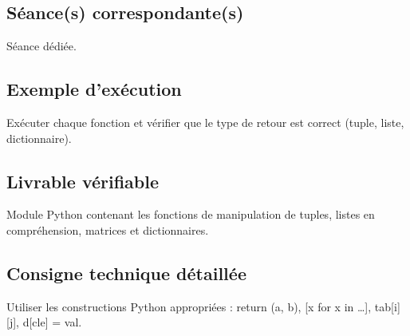 \subsection{Séance(s) correspondante(s)}

Séance dédiée.

\subsection{Exemple d’exécution}

Exécuter chaque fonction et vérifier que le type de retour est correct
(tuple, liste, dictionnaire).

\subsection{Livrable vérifiable}

Module Python contenant les fonctions de manipulation de tuples, listes
en compréhension, matrices et dictionnaires.

\subsection{Consigne technique détaillée}

Utiliser les constructions Python appropriées : return (a, b), {[}x for
x in \ldots{]}, tab{[}i{]}{[}j{]}, d{[}cle{]} = val.
